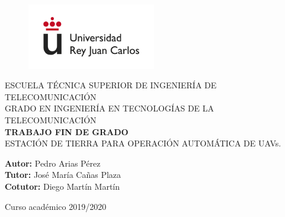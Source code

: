 \begin{figure}[t]
    \centering\includegraphics[width=0.5\textwidth]{figures/urjc_logo_letters.jpg}
\end{figure}

\begin{center}
    \textsc{ \Large{ESCUELA TÉCNICA SUPERIOR DE INGENIERÍA DE TELECOMUNICACIÓN \\}}
    \vspace{10mm}
	\textnormal{ \Large{GRADO EN INGENIERÍA  EN TECNOLOGÍAS DE LA TELECOMUNICACIÓN\\}}
	\vspace{25mm}
    \textup{\LARGE{\textbf{TRABAJO FIN DE GRADO}}} \\
    
    \vspace{25mm}
    \textnormal{ \Large{ESTACIÓN DE TIERRA PARA OPERACIÓN AUTOMÁTICA DE UAVs.}}
\end{center}

\vspace{30mm}

\begin{center}
    \textnormal{\normalsize{\textbf{Autor:} Pedro Arias Pérez \\}}
    \textnormal{\normalsize{\textbf{Tutor:} José María Cañas Plaza \\}}
    \textnormal{\normalsize{\textbf{Cotutor:} Diego Martín Martín \\}}
\end{center}

\vspace{20mm}

\begin{center}
   \normalsize{Curso académico 2019/2020} 
\end{center}
